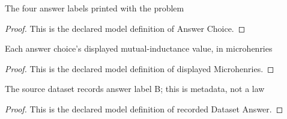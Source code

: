 \begin{definition}
  \label{def:physics:phyx-mini-0939:phyxminiproblems-problemphyxmini0939-answerchoice}
  The four answer labels printed with the problem
\end{definition}
\begin{proof}
  This is the declared model definition of Answer Choice.
\end{proof}
\begin{definition}
  \label{def:physics:phyx-mini-0939:phyxminiproblems-problemphyxmini0939-answerchoice-displayedmicrohenries}
  Each answer choice's displayed mutual-inductance value, in microhenries
\end{definition}
\begin{proof}
  This is the declared model definition of displayed Microhenries.
\end{proof}
\begin{definition}
  \label{def:physics:phyx-mini-0939:phyxminiproblems-problemphyxmini0939-recordeddatasetanswer}
  The source dataset records answer label B; this is metadata, not a law
\end{definition}
\begin{proof}
  This is the declared model definition of recorded Dataset Answer.
\end{proof}
